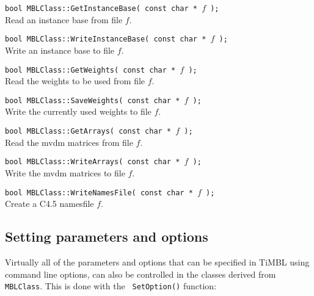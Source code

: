 \documentclass{report}
\begin{document}
\begin{description}
\item {\tt bool MBLClass::GetInstanceBase( const char * $f$ );}\\
Read an instance base from file $f$.

\item {\tt bool MBLClass::WriteInstanceBase( const char * $f$ );}\\
Write an instance base to file $f$.

\item {\tt bool MBLClass::GetWeights( const char * $f$ );}\\ Read the
weights to be used from file $f$.

\item {\tt bool MBLClass::SaveWeights( const char * $f$ );}\\
Write the currently used weights to file $f$.

%
\item {\tt bool MBLClass::GetArrays( const char * $f$ );}\\
Read the {\sc mvdm} matrices from file $f$.

\item {\tt bool MBLClass::WriteArrays( const char * $f$ );}\\
Write the {\sc mvdm} matrices to file $f$.

\item {\tt bool MBLClass::WriteNamesFile( const char * $f$ );}\\
Create a C4.5 namesfile $f$.

\end{description}

\subsection{Setting parameters and options}

Virtually all of the parameters and options that can be specified in
TiMBL using command line options, can also be controlled in the
classes derived from {\tt MBLClass}. This is done with the {\tt
SetOption()} function:
\end{document}
